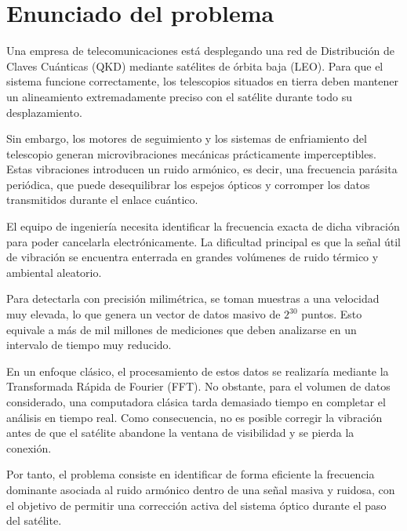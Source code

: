 \chapter{Enunciado del problema}

Una empresa de telecomunicaciones está desplegando una red de Distribución de Claves Cuánticas (QKD) mediante satélites de órbita baja (LEO). Para que el sistema funcione correctamente, los telescopios situados en tierra deben mantener un alineamiento extremadamente preciso con el satélite durante todo su desplazamiento.

Sin embargo, los motores de seguimiento y los sistemas de enfriamiento del telescopio generan microvibraciones mecánicas prácticamente imperceptibles. Estas vibraciones introducen un ruido armónico, es decir, una frecuencia parásita periódica, que puede desequilibrar los espejos ópticos y corromper los datos transmitidos durante el enlace cuántico.

El equipo de ingeniería necesita identificar la frecuencia exacta de dicha vibración para poder cancelarla electrónicamente. La dificultad principal es que la señal útil de vibración se encuentra enterrada en grandes volúmenes de ruido térmico y ambiental aleatorio.

Para detectarla con precisión milimétrica, se toman muestras a una velocidad muy elevada, lo que genera un vector de datos masivo de $2^{30}$ puntos. Esto equivale a más de mil millones de mediciones que deben analizarse en un intervalo de tiempo muy reducido.

En un enfoque clásico, el procesamiento de estos datos se realizaría mediante la Transformada Rápida de Fourier (FFT). No obstante, para el volumen de datos considerado, una computadora clásica tarda demasiado tiempo en completar el análisis en tiempo real. Como consecuencia, no es posible corregir la vibración antes de que el satélite abandone la ventana de visibilidad y se pierda la conexión.

Por tanto, el problema consiste en identificar de forma eficiente la frecuencia dominante asociada al ruido armónico dentro de una señal masiva y ruidosa, con el objetivo de permitir una corrección activa del sistema óptico durante el paso del satélite.
